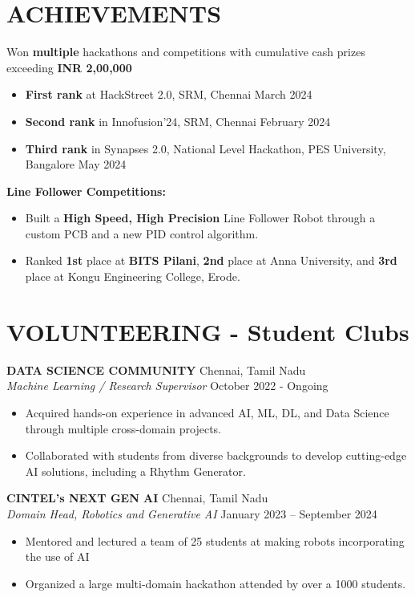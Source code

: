 \documentclass[a4paper,9pt]{extarticle}
\begin{document}
\section*{ACHIEVEMENTS}
Won \textbf{multiple} hackathons and competitions with cumulative cash prizes exceeding\textbf{ INR 2,00,000}\begin{itemize}
    \item \textbf{First rank} at HackStreet 2.0, SRM, Chennai \hfill March 2024
    \item \textbf{Second rank} in Innofusion'24, SRM, Chennai \hfill February 2024 
    \item \textbf{Third rank} in Synapses 2.0, National Level Hackathon, PES University, Bangalore \hfill May 2024
    \end{itemize}
\textbf{Line Follower Competitions:}
    \begin{itemize}
        \item  Built a \textbf{High Speed, High Precision} Line Follower Robot through a custom PCB and a new PID control algorithm. 
        \item Ranked \textbf{1st} place at \textbf{BITS Pilani}, \textbf{2nd} place at Anna University, and \textbf{3rd} place at Kongu Engineering College, Erode.  
    \end{itemize}

\section*{VOLUNTEERING - Student Clubs}
\noindent
\textbf{DATA SCIENCE COMMUNITY} \hfill Chennai, Tamil Nadu\\ %
\textit{Machine Learning / Research Supervisor} \hfill October 2022 - Ongoing %
\begin{itemize}
    \item Acquired hands-on experience in advanced AI, ML, DL, and Data Science through multiple cross-domain projects.
    \item Collaborated with students from diverse backgrounds to develop cutting-edge AI solutions, including a Rhythm Generator.

\end{itemize}
\noindent
\textbf{CINTEL’s NEXT GEN AI} \hfill Chennai, Tamil Nadu\\ %
\textit{Domain Head, Robotics and Generative AI} \hfill January 2023 – September 2024 %
\begin{itemize}
    \item Mentored and lectured a team of 25 students at making robots incorporating the use of AI
    \item Organized a large multi-domain hackathon attended by over a 1000 students. %
\end{itemize}

\end{document}
